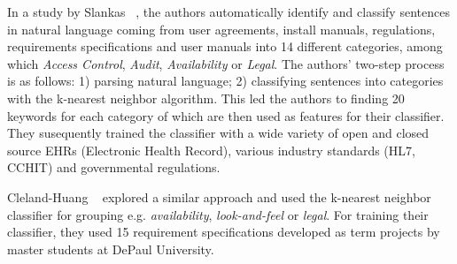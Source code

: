 In a study by Slankas \etal~\cite{Slankas:2013}, the authors automatically
identify and classify sentences in natural language coming from user agreements,
install manuals, regulations, requirements specifications and user manuals into 14
different \NFR categories, among which \emph{Access Control}, \emph{Audit},
\emph{Availability} or \emph{Legal}.
The authors' two-step process is as follows: 1) parsing natural language; 2)
classifying sentences into categories with the k-nearest neighbor algorithm.
This led the authors to finding 20 keywords for each category of \NFR which are
then used as features for their classifier.
They susequently trained the \NFR classifier with a wide variety of open and
closed source EHRs (Electronic Health Record), various industry standards (HL7, CCHIT)
and governmental regulations.

Cleland-Huang \etal~\cite{Cleland-Huang2007} explored a similar approach and
used the k-nearest neighbor classifier for grouping \NFRs e.g.
\emph{availability}, \emph{look-and-feel} or \emph{legal}. For training their
classifier, they used 15 requirement specifications developed as term projects
by master students at DePaul University.
